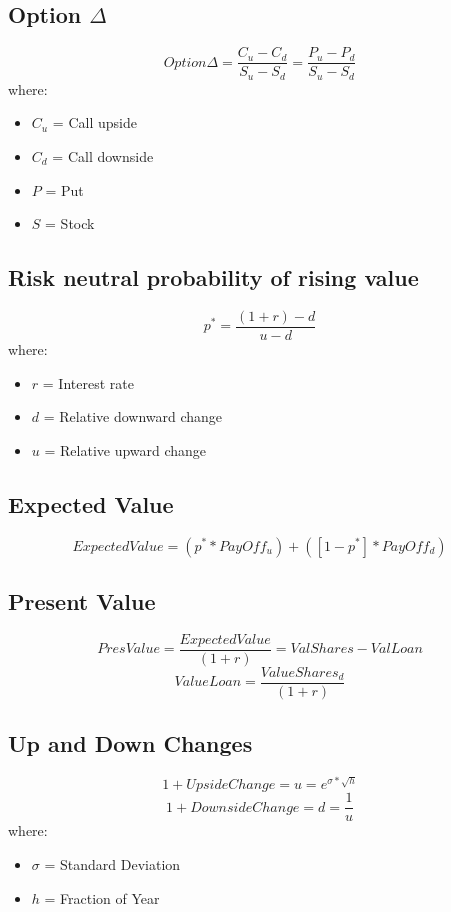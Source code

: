 \documentclass{cheatsheet}
\begin{document}
\subsection{Option $\Delta$}
\[Option \Delta = \frac{C_u - C_d}{S_u - S_d} = \frac{P_u - P_d}{S_u - S_d}\]
\noindent where:
\begin{itemize}
  \item $C_u$ = Call upside
  \item $C_d$ = Call downside
  \item $P$ = Put
  \item $S$ = Stock
\end{itemize}
\subsection{Risk neutral probability of rising value}
\[p^{*} = \frac{(1+r) - d}{u-d}\]
\noindent where:
\begin{itemize}
  \item $r$ = Interest rate
  \item $d$ = Relative downward change
  \item $u$ = Relative upward change
\end{itemize}
\subsection{Expected Value}
\[Expected Value = (p^{*} * PayOff_u) + ([1 - p^{*}] * PayOff_d)\]
\subsection{Present Value}
\[Pres Value = \frac{Expected Value}{(1+r)} = ValShares - ValLoan\]
\[Value Loan = \frac{ValueShares_d}{(1+r)}\]
\subsection{Up and Down Changes}
\[1 + UpsideChange = u = e^{\sigma*\sqrt{h}}\]
\[1 + DownsideChange = d = \frac{1}{u}\]
\noindent where:
\begin{itemize}
  \item $\sigma$ = Standard Deviation
  \item $h$ = Fraction of Year
\end{itemize}
\end{document}
